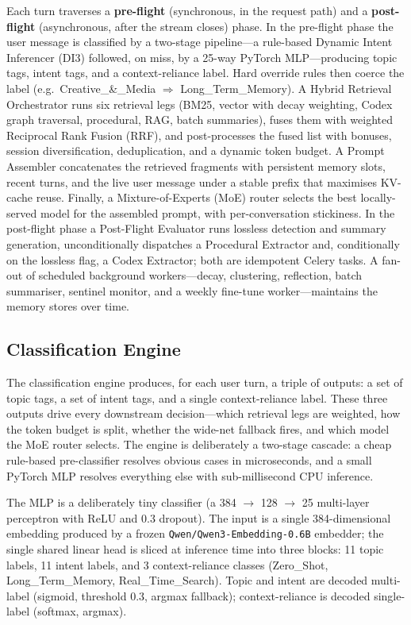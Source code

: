 \documentclass[10pt]{article}
\begin{document}
Each turn traverses a \textbf{pre-flight} (synchronous, in the request path) and a \textbf{post-flight} (asynchronous, after the stream closes) phase. In the pre-flight phase the user message is classified by a two-stage pipeline---a rule-based Dynamic Intent Inferencer (DI3) followed, on miss, by a 25-way PyTorch MLP---producing topic tags, intent tags, and a context-reliance label. Hard override rules then coerce the label (e.g.\ Creative\_\&\_Media $\Rightarrow$ Long\_Term\_Memory). A Hybrid Retrieval Orchestrator runs six retrieval legs (BM25, vector with decay weighting, Codex graph traversal, procedural, RAG, batch summaries), fuses them with weighted Reciprocal Rank Fusion (RRF), and post-processes the fused list with bonuses, session diversification, deduplication, and a dynamic token budget. A Prompt Assembler concatenates the retrieved fragments with persistent memory slots, recent turns, and the live user message under a stable prefix that maximises KV-cache reuse. Finally, a Mixture-of-Experts (MoE) router selects the best locally-served model for the assembled prompt, with per-conversation stickiness. In the post-flight phase a Post-Flight Evaluator runs lossless detection and summary generation, unconditionally dispatches a Procedural Extractor and, conditionally on the lossless flag, a Codex Extractor; both are idempotent Celery tasks. A fan-out of scheduled background workers---decay, clustering, reflection, batch summariser, sentinel monitor, and a weekly fine-tune worker---maintains the memory stores over time.

\subsection{Classification Engine}

The classification engine produces, for each user turn, a triple of outputs: a set of topic tags, a set of intent tags, and a single context-reliance label. These three outputs drive every downstream decision---which retrieval legs are weighted, how the token budget is split, whether the wide-net fallback fires, and which model the MoE router selects. The engine is deliberately a two-stage cascade: a cheap rule-based pre-classifier resolves obvious cases in microseconds, and a small PyTorch MLP resolves everything else with sub-millisecond CPU inference.

The MLP is a deliberately tiny classifier (a 384 $\rightarrow$ 128 $\rightarrow$ 25 multi-layer perceptron with ReLU and 0.3 dropout). The input is a single 384-dimensional embedding produced by a frozen \texttt{Qwen/Qwen3-Embedding-0.6B} embedder; the single shared linear head is sliced at inference time into three blocks: 11 topic labels, 11 intent labels, and 3 context-reliance classes (Zero\_Shot, Long\_Term\_Memory, Real\_Time\_Search). Topic and intent are decoded multi-label (sigmoid, threshold 0.3, argmax fallback); context-reliance is decoded single-label (softmax, argmax).
\end{document}
